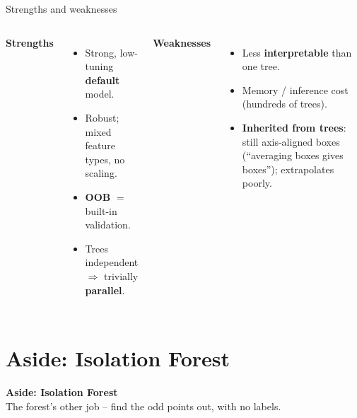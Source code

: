 \documentclass[aspectratio=169]{beamer}
\newcommand{\sectiontransition}[2]{%
  \begin{frame}[plain]
    \vfill
    \begin{center}
      {\Large\color{popblue}\textbf{#1}}\\[10pt]
      {\normalsize #2}
    \end{center}
    \vfill
  \end{frame}}
\begin{document}
\begin{frame}{Strengths and weaknesses}
  \begin{columns}[T]
    \textbf{Strengths}
    \begin{itemize}\small
      \item Strong, low-tuning \textbf{default} model.
      \item Robust; mixed feature types, no scaling.
      \item \textbf{OOB} $=$ built-in validation.
      \item Trees independent $\Rightarrow$ trivially \textbf{parallel}.
    \end{itemize}
    \textbf{Weaknesses}
    \begin{itemize}\small
      \item Less \textbf{interpretable} than one tree.
      \item Memory / inference cost (hundreds of trees).
      \item \textbf{Inherited from trees}: still axis-aligned boxes (``averaging boxes
        gives boxes''); extrapolates poorly.
    \end{itemize}
  \end{columns}
  \vfill
\end{frame}

\section{Aside: Isolation Forest}
\sectiontransition{Aside: Isolation Forest}{The forest's other job -- find the odd points out, with no labels.}
\end{document}
